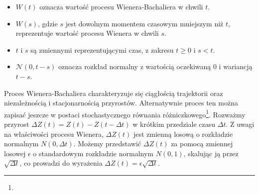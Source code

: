 \begin{itemize}
  \item \( W(t) \) oznacza wartość procesu Wienera-Bachaliera w chwili \( t \).
  \item \( W(s) \), gdzie \( s \) jest dowolnym momentem czasowym mniejszym niż \( t \), reprezentuje wartość procesu Wienera w chwili \( s \).
  \item \( t \) i \( s \) są zmiennymi reprezentującymi czas, z zakresu \( t \geq 0 \) i \( s < t \).
  \item \( \mathcal{N}(0, t - s) \) oznacza rozkład normalny z wartością oczekiwaną 0 i wariancją \( t - s \).
\end{itemize}
Proces Wienera-Bachaliera charakteryzuje się ciągłością trajektorii oraz niezależnością i stacjonarnością przyrostów. Alternatywnie proces ten można zapisać jeszcze w postaci stochastycznego równania różniczkowego\footnote{}. Rozważmy przyrost \( \Delta Z(t) = Z(t) - Z(t - \Delta t) \) w krótkim przedziale czasu \( \Delta t \). Z uwagi na właściwości procesu Wienera, \( \Delta Z(t) \) jest zmienną losową o rozkładzie normalnym \( N(0, \Delta t) \). Możemy przedstawić \( \Delta Z(t) \) za pomocą zmiennej losowej \( \epsilon \) o standardowym rozkładzie normalnym \( N(0, 1) \), skalując ją przez \( \sqrt{\Delta t} \), co prowadzi do wyrażenia \( \Delta Z(t) = \epsilon \sqrt{\Delta t} \).


